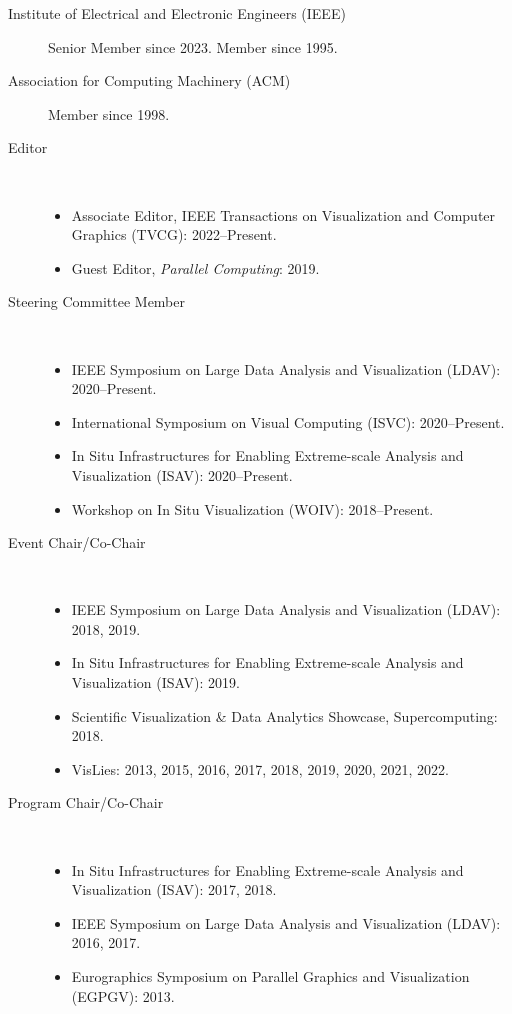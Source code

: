 \documentclass{article}
\begin{document}
\begin{description}
\item[Institute of Electrical and Electronic Engineers (IEEE)]
  Senior Member since 2023. Member since 1995.
\item[Association for Computing Machinery (ACM)]  Member since 1998.
\item[Editor]~
  \begin{itemize}
  \item
    Associate Editor, IEEE Transactions on Visualization and Computer Graphics (TVCG): 2022--Present.
  \item
    Guest Editor, \emph{Parallel Computing}: 2019.
  \end{itemize}
\item[Steering Committee Member]~
  \begin{itemize}
  \item
    IEEE Symposium on Large Data Analysis and Visualization (LDAV): 2020--Present.
  \item
    International Symposium on Visual Computing (ISVC): 2020--Present.
  \item
    In Situ Infrastructures for Enabling Extreme-scale Analysis and Visualization (ISAV): 2020--Present.
  \item
    Workshop on In Situ Visualization (WOIV): 2018--Present.
  \end{itemize}
\item[Event Chair/Co-Chair]~
  \begin{itemize}
  \item
    IEEE Symposium on Large Data Analysis and Visualization (LDAV): 2018, 2019.
  \item
    In Situ Infrastructures for Enabling Extreme-scale Analysis and Visualization (ISAV): 2019.
  \item
    Scientific Visualization \& Data Analytics Showcase, Supercomputing: 2018.
  \item
    VisLies: 2013, 2015, 2016, 2017, 2018, 2019, 2020, 2021, 2022.
  \end{itemize}
\item[Program Chair/Co-Chair]~
  \begin{itemize}
  \item
    In Situ Infrastructures for Enabling Extreme-scale Analysis and Visualization (ISAV): 2017, 2018.
  \item
    IEEE Symposium on Large Data Analysis and Visualization (LDAV): 2016, 2017.
  \item
    Eurographics Symposium on Parallel Graphics and Visualization (EGPGV): 2013.

\end{itemize}
\end{description}
\end{document}
